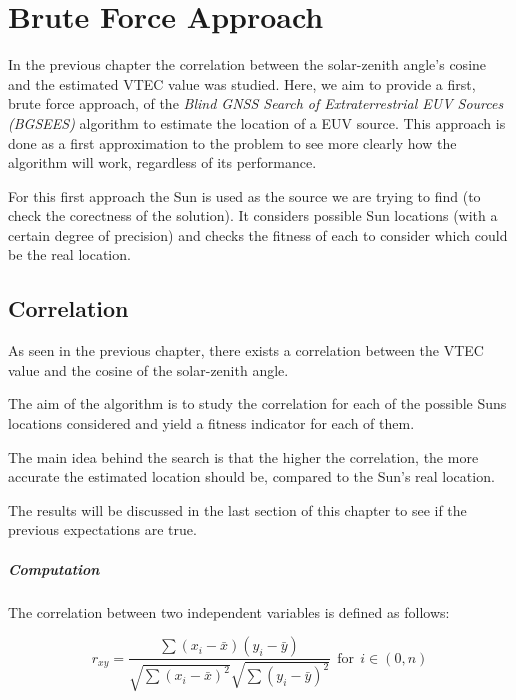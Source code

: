 \chapter{Brute Force Approach}

In the previous chapter the correlation between the solar-zenith angle's cosine and the estimated VTEC value was studied. Here, we aim to provide a first, brute force approach, of the \textit{Blind GNSS Search of Extraterrestrial EUV Sources (BGSEES)} algorithm to estimate the location of a EUV source. This approach is done as a first approximation to the problem to see more clearly how the algorithm will work, regardless of its performance.

For this first approach the Sun is used as the source we are trying to find (to check the corectness of the solution). It considers possible Sun locations (with a certain degree of precision) and checks the fitness of each to consider which could be the real location.

\section{Correlation}

As seen in the previous chapter, there exists a correlation between the VTEC value and the cosine of the solar-zenith angle. 

The aim of the algorithm is to study the correlation for each of the possible Suns locations considered and yield a fitness indicator for each of them. 

The main idea behind the search is that the higher the correlation, the more accurate the estimated location should be, compared to the Sun's real location. 

The results will be discussed in the last section of this chapter to see if the previous expectations are true.

\paragraph{Computation}

The correlation between two independent variables is defined as follows:

\begin{equation} \label{eq:coefficient}
r_{xy} = \frac{\sum(x_{i} - \bar{x})(y_{i} - \bar{y})}
{\sqrt{\sum(x_{i} - \bar{x})^{2}}
	\sqrt{\sum(y_{i} - \bar{y})^{2}}} \ \ \text{for} \ \ i \in (0, n)
\end{equation} \\

